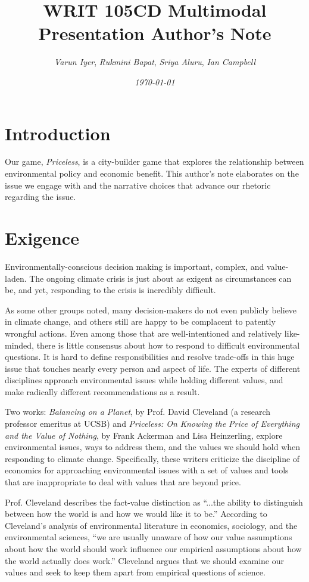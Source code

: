 \documentclass[12pt]{article}
\title{WRIT 105CD Multimodal Presentation Author’s Note}
\author{\emph{Varun Iyer}, \emph{Rukmini Bapat}, \emph{Sriya Aluru}, \emph{Ian Campbell}}
\date{\emph{\today}}
\begin{document}
	\maketitle	
	\section*{Introduction}
		Our game, \emph{Priceless}, is a city-builder game that explores the
		relationship between environmental policy and economic benefit. This
		author’s note elaborates on the issue we engage with and the narrative
		choices that advance our rhetoric regarding the issue.

	\section{Exigence}
		
		Environmentally-conscious decision making is important, complex, and
		value-laden. The ongoing climate crisis is just about as exigent as
		circumstances can be, and yet, responding to the crisis is incredibly
		difficult.

		As some other groups noted, many decision-makers do not even publicly
		believe in climate change, and others still are happy to be complacent
		to patently wrongful actions. Even among those that are
		well-intentioned and relatively like-minded, there is little consensus
		about how to respond to difficult environmental questions.  It
		is hard to define responsibilities and resolve trade-offs in this huge
		issue that touches nearly every person and aspect of life.  The experts
		of different disciplines approach environmental issues while holding
		different values, and make radically different recommendations as a
		result.

		Two works: \emph{Balancing on a Planet}, by Prof. David Cleveland (a
		research professor emeritus at UCSB) and \emph{Priceless: On Knowing
		the Price of Everything and the Value of Nothing}, by Frank Ackerman
		and Lisa Heinzerling, explore environmental issues, ways to address
		them, and the values we should hold when responding to climate change.
		Specifically, these writers criticize the discipline of economics for
		approaching environmental issues with a set of values and tools that are
		inappropriate to deal with values that are beyond price.

		Prof. Cleveland describes the fact-value distinction as “...the ability
		to distinguish between how the world is and how we would like it to
		be.”\autocite[5]{bop} According to Cleveland’s analysis of
		environmental literature in economics, sociology, and the environmental
		sciences, “we are usually unaware of how our value assumptions about
		how the world should work influence our empirical assumptions about how
		the world actually does work.”\autocite[5]{bop} Cleveland argues that
		we should examine our values and seek to keep them apart from empirical
		questions of science.
\end{document}
